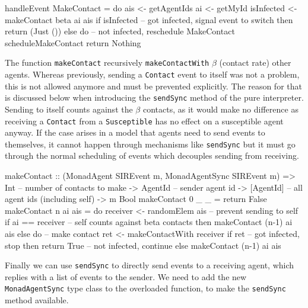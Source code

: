 \begin{HaskellCode}
handleEvent MakeContact = do
  ais        <- getAgentIds
  ai         <- getMyId
  isInfected <- makeContact beta ai ais
  if isInfected
    -- got infected, signal event to switch
    then return (Just ())
    else do
      -- not infected, reschedule MakeContact
      scheduleMakeContact
      return Nothing
\end{HaskellCode}

The function \texttt{makeContact} recursively \texttt{makeContactWith} $\beta$ (contact rate) other agents. Whereas previously, sending a \texttt{Contact} event to itself was not a problem, this is not allowed anymore and must be prevented explicitly. The reason for that is discussed below when introducing the \texttt{sendSync} method of the pure interpreter. Sending to itself counts against the $\beta$ contacts, as it would make no difference as receiving a \texttt{Contact} from a \texttt{Susceptible} has no effect on a susceptible agent anyway. If the case arises in a model that agents need to send events to themselves, it cannot happen through mechanisms like \texttt{sendSync} but it must go through the normal scheduling of events which decouples sending from receiving.

\begin{HaskellCode}
makeContact :: (MonadAgent SIREvent m, MonadAgentSync SIREvent m)
            => Int       -- number of contacts to make
            -> AgentId   -- sender agent id
            -> [AgentId] -- all agent ids (including self)
            -> m Bool
makeContact 0 _ _ = return False
makeContact n ai ais = do
  receiver <- randomElem ais
  -- prevent sending to self
  if ai == receiver
    -- self counts against beta contacts
    then makeContact (n-1) ai ais
    else do
      -- make contact
      ret <- makeContactWith receiver
      if ret
        -- got infected, stop
        then return True
        -- not infected, continue
        else makeContact (n-1) ai ais
\end{HaskellCode}

Finally we can use \texttt{sendSync} to directly send events to a receiving agent, which replies with a list of events to the sender. We need to add the new \texttt{MonadAgentSync} type class to the overloaded function, to make the \texttt{sendSync} method available.

